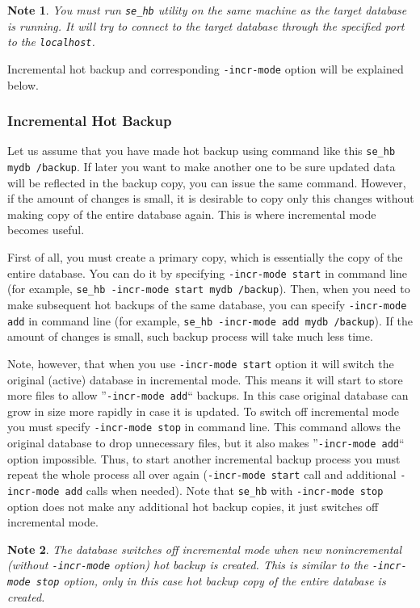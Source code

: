 \documentclass[a4paper,12pt]{article}
\newtheorem{note}{Note}
\begin{document}
\begin{note}
You must run \verb!se_hb! utility on the same machine as the target database is running. It will try to connect to
the target database through the specified port to the \verb!localhost!.
\end{note}

Incremental hot backup and corresponding \verb!-incr-mode! option will be explained below.

\subsubsection*{Incremental Hot Backup}

Let us assume that you have made hot backup using command like this \verb!se_hb mydb /backup!. If later you want
to make another one to be sure updated data will be reflected in the backup copy, you can issue the same command.
However, if the amount of changes is small, it is desirable to copy only this changes without making copy of the entire
database again. This is where incremental mode becomes useful.

First of all, you must create a primary copy, which is essentially the copy of the entire database. You can do it by
specifying \verb!-incr-mode start! in command line (for example, \verb!se_hb -incr-mode start mydb /backup!).
Then, when you
need to make subsequent hot backups of the same database, you can specify \verb!-incr-mode add! in command line
(for example, \verb!se_hb -incr-mode add mydb /backup!). If the amount of changes is small, such backup process will take
much less time.

Note, however, that when you use \verb!-incr-mode start! option it will switch the original (active) database in incremental mode.
This means it will start to store more files to allow ''\verb!-incr-mode add!`` backups. In this case original database can grow
in size more rapidly in case it is updated. To switch off incremental mode you must specify \verb!-incr-mode stop! in command line. This command
allows the original database to drop unnecessary files, but it also makes ''\verb!-incr-mode add!`` option impossible. Thus, to
start another incremental backup process you must repeat the whole process all over again (\verb!-incr-mode start! call and additional
\verb!-incr-mode add! calls when needed). Note that \verb!se_hb! with \verb!-incr-mode stop! option does not make any
additional hot backup copies, it just switches off incremental mode.

\begin{note}
The database switches off incremental mode when new nonincremental (without \verb!-incr-mode! option)
hot backup is created. This is similar to the \verb!-incr-mode stop! option, only in this case hot backup copy of the
entire database is created.
\end{note}
\end{document}
